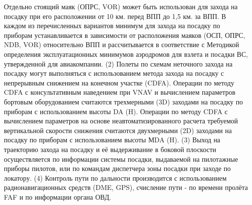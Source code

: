 Отдельно стоящий маяк (ОПРС, VOR) может быть использован для захода на посадку при его расположении от 10 км. перед ВПП до 1,5 км. за ВПП. 
В каждом из перечисленных вариантов минимум для захода на посадку по приборам устанавливается в зависимости от расположения маяков (ОСП, ОПРС, NDB, VOR) относительно ВПП и рассчитывается в соответствие с Методикой определения эксплуатационных минимумов аэродромов для взлета и посадки ВС, утвержденной для авиакомпании.
(2) Полеты по схемам неточного захода на посадку могут выполняться с использованием метода захода на посадку с непрерывным снижением на конечном участке (CDFA). Операции по методу CDFA с консультативным наведением при VNAV и вычислением параметров бортовым оборудованием считаются трехмерными (3D) заходами на посадку по приборам с использованием высоты DA (H).
Операции по методу CDFA с вычислением параметров на основе неавтоматизированного расчета требуемой вертикальной скорости снижения считаются двухмерными (2D) заходами на посадку по приборам с использованием высоты МDA (H).
(3) Выход на траекторию захода на посадку и её выдерживание в боковой плоскости осуществляется по информации системы посадки, выдаваемой на пилотажные приборы пилотов, или по командам диспетчера зоны посадки при заходе по локатору.
(4) Контроль пути по дальности производится с использованием радионавигационных средств (DME, GPS), счисление пути - по времени пролёта FAF и по информации органа ОВД.

